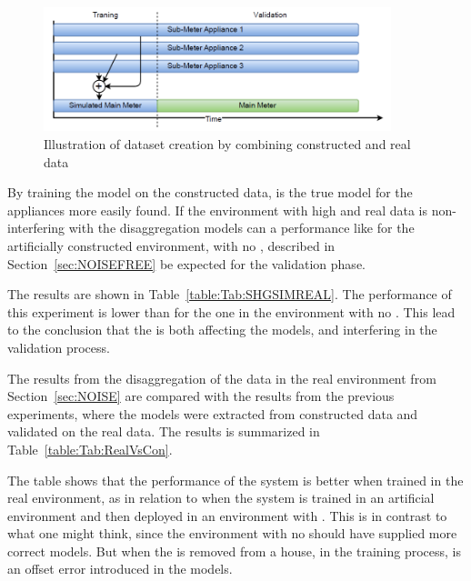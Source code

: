 \begin{figure}[H]
\centering
\includegraphics[width=0.9\textwidth]{billeder/SIMREAL.png}
\caption{Illustration of dataset creation by combining constructed and real data}
\label{fig:SHGSIMREAL}
\end{figure}

By training the model on the constructed data, is the true model for the appliances more easily found. If the environment with high  and real data is non-interfering with the disaggregation models can a performance like for the artificially constructed environment, with no , described in Section~\ref{sec:NOISEFREE} be expected for the validation phase. 




The results are shown in Table~\ref{table:Tab:SHGSIMREAL}. The performance of this experiment is lower than for the one in the environment with no . This lead to the conclusion that the  is both affecting the models, and interfering in the validation process.  

The results from the disaggregation of the data in the real environment from Section~\ref{sec:NOISE} are compared with the results from the previous experiments, where the models were extracted from constructed data and validated on the real data. The results is summarized in Table~\ref{table:Tab:RealVsCon}. 



The table shows that the performance of the system is better when trained in the real environment, as in relation to when the system is trained in an artificial environment and then deployed in an environment with . This is in contrast to what one might think, since the environment with no  should have supplied more correct models. But when the  is removed from a house, in the training process, is an offset error introduced in the models. 

